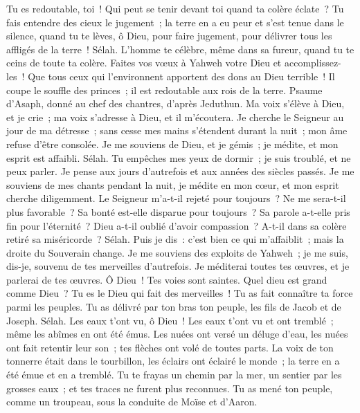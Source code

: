 \begin{multicols}{2}
Tu es redoutable, toi~! Qui peut se tenir devant toi quand ta colère éclate~?
Tu fais entendre des cieux le jugement~; la terre en a eu peur et s'est tenue dans le silence,
quand tu te lèves, ô Dieu, pour faire jugement, pour délivrer tous les affligés de la terre~! Sélah.
L'homme te célèbre, même dans sa fureur, quand tu te ceins de toute ta colère.
Faites vos vœux à Yahweh votre Dieu et accomplissez-les~! Que tous ceux qui l'environnent apportent des dons au Dieu terrible~!
Il coupe le souffle des princes~; il est redoutable aux rois de la terre.
\VerseOne{}Psaume d'Asaph, donné au chef des chantres, d'après Jeduthun.
Ma voix s'élève à Dieu, et je crie~; ma voix s'adresse à Dieu, et il m'écoutera.
Je cherche le Seigneur au jour de ma détresse~; sans cesse mes mains s'étendent durant la nuit~; mon âme refuse d'être consolée.
Je me souviens de Dieu, et je gémis~; je médite, et mon esprit est affaibli. Sélah.
Tu empêches mes yeux de dormir~; je suis troublé, et ne peux parler.
Je pense aux jours d'autrefois et aux années des siècles passés.
Je me souviens de mes chants pendant la nuit, je médite en mon cœur, et mon esprit cherche diligemment.
Le Seigneur m'a-t-il rejeté pour toujours~? Ne me sera-t-il plus favorable~?
Sa bonté est-elle disparue pour toujours~? Sa parole a-t-elle pris fin pour l'éternité~?
Dieu a-t-il oublié d'avoir compassion~? A-t-il dans sa colère retiré sa miséricorde~? Sélah.
Puis je dis~: c'est bien ce qui m'affaiblit~; mais la droite du Souverain change.
Je me souviens des exploits de Yahweh~; je me suis, dis-je, souvenu de tes merveilles d'autrefois.
Je méditerai toutes tes œuvres, et je parlerai de tes œuvres.
Ô Dieu~! Tes voies sont saintes. Quel dieu est grand comme Dieu~?
Tu es le Dieu qui fait des merveilles~! Tu as fait connaître ta force parmi les peuples.
Tu as délivré par ton bras ton peuple, les fils de Jacob et de Joseph. Sélah.
Les eaux t'ont vu, ô Dieu~! Les eaux t'ont vu et ont tremblé~; même les abîmes en ont été émus.
Les nuées ont versé un déluge d'eau, les nuées ont fait retentir leur son~; tes flèches ont volé de toutes parts.
La voix de ton tonnerre était dans le tourbillon, les éclairs ont éclairé le monde~; la terre en a été émue et en a tremblé.
Tu te frayas un chemin par la mer, un sentier par les grosses eaux~; et tes traces ne furent plus reconnues.
Tu as mené ton peuple, comme un troupeau, sous la conduite de Moïse et d'Aaron.

\end{multicols}
